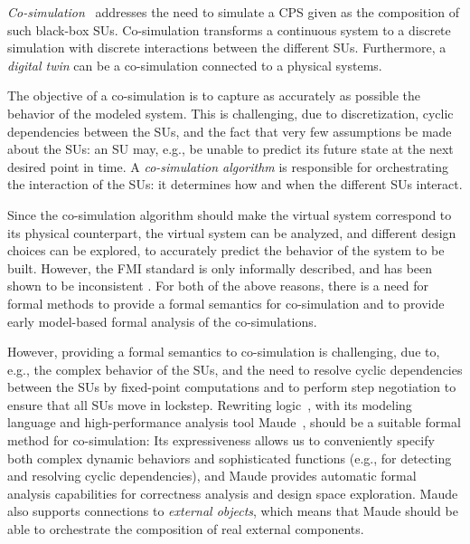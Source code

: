 \emph{Co-simulation}~\cite{Kubler2000,Gomes2018} addresses the need to
simulate a  CPS given as the
composition of  such black-box SUs.
Co-simulation transforms a continuous system to a discrete simulation
with discrete  interactions between the different SUs.
Furthermore, a \emph{digital twin} can be a co-simulation connected to
a  physical  systems.

The   objective of a
co-simulation is to capture as accurately as possible   
the behavior of  the modeled system. This is challenging,  due
to discretization,  cyclic dependencies between the SUs,  and the fact
that very few  assumptions be made about the SUs: an SU may, e.g., be
unable to predict  its future state at the next desired point in time.
A \emph{co-simulation algorithm} is responsible for orchestrating the
interaction of the SUs:   it determines how and when the different SUs
interact. 

Since the co-simulation algorithm should make   the virtual
system correspond  to its physical
counterpart,   the virtual system can be analyzed,
and different design  choices can be explored,  to accurately predict
the behavior of the  system to be built. 
%  
However, the FMI standard is only informally described, and has been
shown to be inconsistent \cite{sampaio_behavioural_2016}.  For both of
the above reasons,  there is
 a need for 
formal methods to provide a formal semantics for co-simulation and to
provide early model-based formal analysis of the co-simulations.   

However, providing a formal semantics to co-simulation is challenging,
due to, e.g.,  the
complex behavior of  the SUs, and the need to resolve cyclic
dependencies between 
the SUs by fixed-point computations and to  perform step negotiation
to ensure that all SUs move in  lockstep.
Rewriting logic~\cite{Mes92}, with its  modeling language and
high-performance  analysis tool Maude~\cite{maude-book}, 
 should be a suitable  formal method for co-simulation: 
 Its expressiveness allows us to conveniently specify both  
 complex dynamic behaviors and 
sophisticated  functions  (e.g., for detecting and resolving cyclic
dependencies), and 
Maude  provides  automatic  formal analysis capabilities for
correctness analysis and 
design space  exploration.
Maude also supports connections to \emph{external objects},
which means  that  Maude   should be able to 
 orchestrate  the composition of real  external components. 

